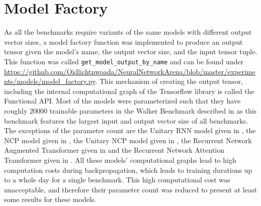 \documentclass[draft,final]{vutinfth} %
\begin{document}
    \section{Model Factory} \label{model_factory}
    As all the benchmarks require variants of the same models with different output vector sizes, a model factory function was implemented to produce an output tensor given the model's name, the output vector size, and the input tensor tuple.
    This function was called \texttt{get\_model\_output\_by\_name} and can be found under \url{https://github.com/Oidlichtnwoada/NeuralNetworkArena/blob/master/experiments/models/model_factory.py}.
    This mechanism of creating the output tensor, including the internal computational graph of the Tensorflow library \cite{Tensorflow} is called the Functional API.
    Most of the models were parameterized such that they have roughly $20000$ trainable parameters in the Walker Benchmark described in  as this benchmark features the largest input and output vector size of all benchmarks.
    The exceptions of the parameter count are the Unitary RNN model given in , the NCP model given in , the Unitary NCP model given in , the Recurrent Network Augmented Transformer given in  and the Recurrent Network Attention Transformer given in .
    All these models' computational graphs lead to high computation costs during backpropagation, which leads to training durations up to a whole day for a single benchmark.
    This high computational cost was unacceptable, and therefore their parameter count was reduced to present at least some results for these models.
\end{document}
